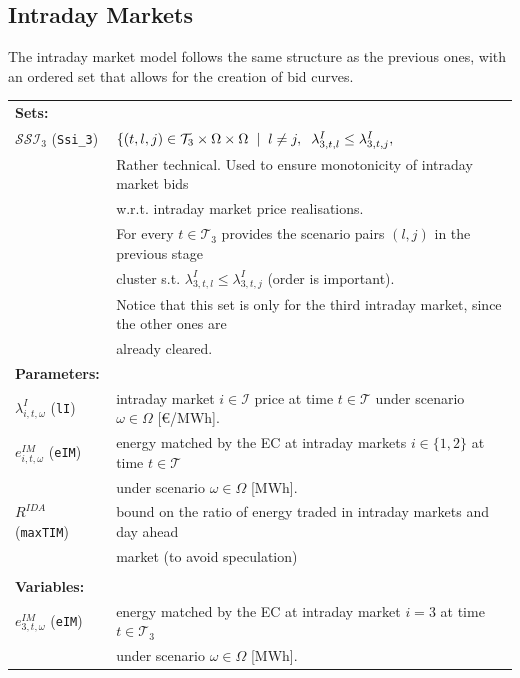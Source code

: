 \documentclass{article}
\begin{document}
\subsection{Intraday Markets}

The intraday market model follows the same structure as the previous ones, with an ordered set that allows for the creation of bid curves.

\begin{tabularx}{\textwidth}{l l}
    \textbf{Sets:} \\
    	$\mathcal{SSI}_3$ (\verb|Ssi_3|) & $\{(t, l, j) \in \mathcal{T}_3 \times \Omega \times \Omega \hspace{2mm} | \hspace{2mm} l \neq j, \hspace{2mm} \lambda^I_{3, t, l} \leq \lambda^I_{3, t, j}, \hspace{2mm}$ \\ 
	& Rather technical. Used to ensure monotonicity of intraday market bids \\
	& w.r.t. intraday market price realisations. \\
	& For every $t \in \mathcal{T}_3$ provides the scenario pairs $(l, j)$ in the previous stage \\
	& cluster s.t. $\lambda^I_{3, t, l} \leq \lambda^I_{3, t, j}$ (order is important).\\
    & Notice that this set is only for the third intraday market, since the other ones are\\
    & already cleared.
    \\
    
\textbf{Parameters:} \\
$\lambda^I_{i, t, \omega}$ (\verb|lI|) & intraday market $i \in \mathcal{I}$ price at time $t \in \mathcal{T}$ under scenario $\omega \in \Omega$ [\euro/MWh]. \\
$e^{IM}_{i, t, \omega}$ (\verb|eIM|) & energy matched by the EC at intraday markets $i \in \{1, 2\}$ at time $t \in \mathcal{T}$ \\
& under scenario $\omega \in \Omega$ [MWh]. \\

$R^{IDA}$ (\verb|maxTIM|) & bound on the ratio of energy traded in intraday markets and day ahead \\
& market (to avoid speculation)\\
\\
\textbf{Variables:} \\
$e^{IM}_{3, t, \omega}$ (\verb|eIM|) & energy matched by the EC at intraday market $i = 3$ at time $t \in \mathcal{T}_3$ \\
& under scenario $\omega \in \Omega$ [MWh]. \\

\end{tabularx}
\end{document}
